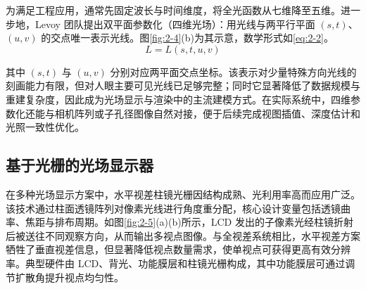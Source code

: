 为满足工程应用，通常先固定波长与时间维度，将全光函数从七维降至五维。进一步地，Levoy 团队提出双平面参数化（四维光场）\cite{Levoy1996}：用光线与两平行平面 $(s,t)$、$(u,v)$ 的交点唯一表示光线。图\ref{fig:2-4}(b)为其示意，数学形式如\ref{eq:2-2}。
\begin{equation}
\label{eq:2-2}
L = L(s, t, u, v) 
\end{equation}

其中 $(s,t)$ 与 $(u,v)$ 分别对应两平面交点坐标。该表示对少量特殊方向光线的刻画能力有限，但对人眼主要可见光线已足够完整；同时它显著降低了数据规模与重建复杂度，因此成为光场显示与渲染中的主流建模方式\cite{Ng2006}。在实际系统中，四维参数化还能与相机阵列或子孔径图像自然对接，便于后续完成视图插值、深度估计和光照一致性优化。





\subsection{基于光栅的光场显示器}

在多种光场显示方案中，水平视差柱镜光栅因结构成熟、光利用率高而应用广泛。该技术通过柱面透镜阵列对像素光线进行角度重分配，核心设计变量包括透镜曲率、焦距与排布周期。如图\ref{fig:2-5}(a)(b)所示，LCD 发出的子像素光经柱镜折射后被送往不同观察方向，从而输出多视点图像。与全视差系统相比，水平视差方案牺牲了垂直视差信息，但显著降低视点数量需求，使单视点可获得更高有效分辨率。典型硬件由 LCD、背光、功能膜层和柱镜光栅构成，其中功能膜层可通过调节扩散角提升视点均匀性。

